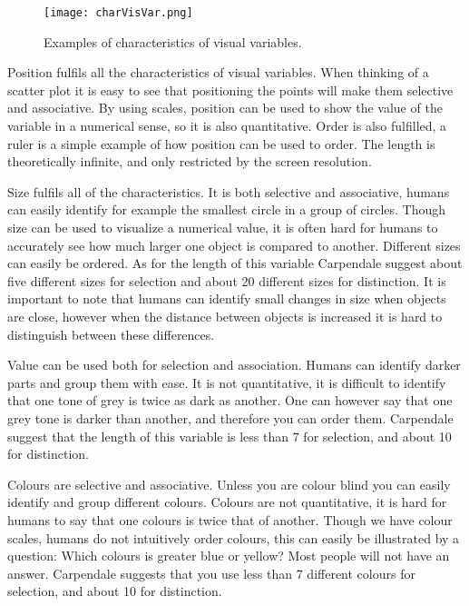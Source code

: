 \begin{figure}[h!]
	\centering
		\texttt{[image: charVisVar.png]}
		\caption{\footnotesize Examples of characteristics of visual variables.}
		\label{fig:charVisVar}
\end{figure}

Position fulfils all the characteristics of visual variables. When thinking of a scatter plot it is easy to see that positioning the points will make them selective and associative. By using scales, position can be used to show the value of the variable in a numerical sense, so it is also quantitative. Order is also fulfilled, a ruler is a simple example of how position can be used to order. The length is theoretically infinite, and only restricted by the screen resolution.

Size fulfils all of the characteristics. It is both selective and associative, humans can easily identify for example the smallest circle in a group of circles. Though size can be used to visualize a numerical value, it is often hard for humans to accurately see how much larger one object is compared to another. Different sizes can easily be ordered. As for the length of this variable Carpendale suggest about five different sizes for selection and about 20 different sizes for distinction. It is important to note that humans can identify small changes in size when objects are close, however when the distance between objects is increased it is hard to distinguish between these differences.

Value can be used both for selection and association. Humans can identify darker parts and group them with ease. It is not quantitative, it is difficult to identify that one tone of grey is twice as dark as another. One can however say that one grey tone is darker than another, and therefore you can order them. Carpendale suggest that the length of this variable is less than 7 for selection, and about 10 for distinction.

Colours are selective and associative. Unless you are colour blind you can easily identify and group different colours. Colours are not quantitative, it is hard for humans to say that one colours is twice that of another. Though we have colour scales, humans do not intuitively order colours, this can easily be illustrated by a question: Which colours is greater blue or yellow? Most people will not have an answer. Carpendale suggests that you use less than 7 different colours for selection, and about 10 for distinction.


